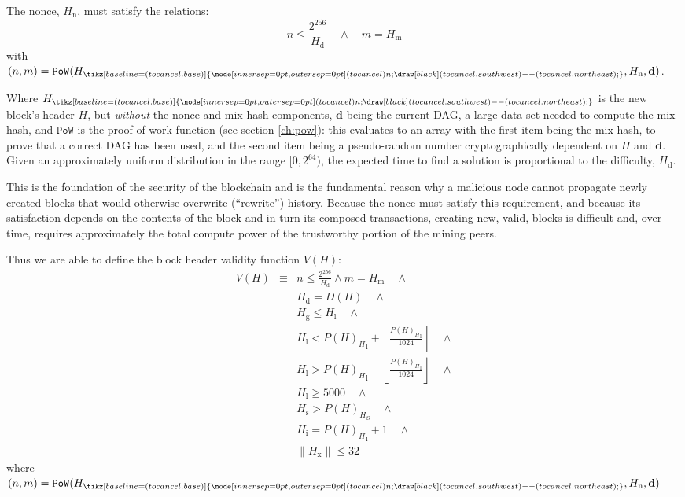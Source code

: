 \documentclass[9pt,oneside]{amsart}
\makeatletter
\newcommand{\linkdest}[1]{\Hy@raisedlink{\hypertarget{#1}{}}}
\newcommand{\hcancel}[1]{%
    \tikz[baseline=(tocancel.base)]{
        \node[inner sep=0pt,outer sep=0pt] (tocancel) {#1};
        \draw[black] (tocancel.south west) -- (tocancel.north east);
    }%
}%
\makeatother
\begin{document}
\begin{multicols}{2}
The nonce, \hyperlink{block_nonce_H__n}{$H_{\mathrm{n}}$}, must satisfy the relations:
\begin{equation}
n \leqslant \frac{2^{256}}{H_{\mathrm{d}}} \quad \wedge \quad m = H_{\mathrm{m}}
\end{equation}
with $(n, m) = \mathtt{PoW}(H_{\hcancel{n}}, H_{\mathrm{n}}, \mathbf{d})$.

\hypertarget{block_header_without_nonce_and_mixmash_h__cancel_n}{}\linkdest{H_cancel_n}Where $H_{\hcancel{n}}$ is the new block's header $H$, but \textit{without} the nonce and mix-hash components, $\mathbf{d}$ being the current DAG, a large data set needed to compute the mix-hash, and $\mathtt{PoW}$ is the proof-of-work function (see section \ref{ch:pow}): this evaluates to an array with the first item being the mix-hash, to prove that a correct DAG has been used, and the second item being a pseudo-random number cryptographically dependent on $H$ and $\mathbf{d}$. Given an approximately uniform distribution in the range $[0, 2^{64})$, the expected time to find a solution is proportional to the difficulty, $H_{\mathrm{d}}$.

This is the foundation of the security of the blockchain and is the fundamental reason why a malicious node cannot propagate newly created blocks that would otherwise overwrite (``rewrite'') history. Because the nonce must satisfy this requirement, and because its satisfaction depends on the contents of the block and in turn its composed transactions, creating new, valid, blocks is difficult and, over time, requires approximately the total compute power of the trustworthy portion of the mining peers.

\hypertarget{block_header_validity_function}{}Thus we are able to define the block header validity function $V(H)$:
\begin{eqnarray}
V(H) & \equiv &  n \leqslant \frac{2^{256}}{H_{\mathrm{d}}} \wedge m = H_{\mathrm{m}} \quad \wedge \\
& & H_{\mathrm{d}} = D(H) \quad \wedge \\
& & H_{\mathrm{g}} \le H_{\mathrm{l}}  \quad \wedge \\
& & H_{\mathrm{l}} < {P(H)_{H}}_{\mathrm{l}} + \left\lfloor\frac{{P(H)_{H}}_{\mathrm{l}}}{1024}\right\rfloor  \quad \wedge \\
& & H_{\mathrm{l}} > {P(H)_{H}}_{\mathrm{l}} - \left\lfloor\frac{{P(H)_{H}}_{\mathrm{l}}}{1024}\right\rfloor  \quad \wedge \\
& & H_{\mathrm{l}} \geqslant 5000  \quad \wedge \\
& & H_{\mathrm{s}} > {P(H)_{H}}_{\mathrm{s}} \quad \wedge \\
& & H_{\mathrm{i}} = {P(H)_{H}}_{\mathrm{i}} +1 \quad \wedge \\
& & \lVert H_{\mathrm{x}} \rVert \le 32
\end{eqnarray}
where $(n, m) = \mathtt{PoW}(H_{\hcancel{n}}, H_{\mathrm{n}}, \mathbf{d})$


\end{multicols}
\end{document}
